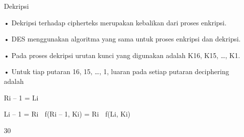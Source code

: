 \documentclass{article}
\begin{document}

Dekripsi

• Dekripsi terhadap cipherteks merupakan kebalikan dari proses enkripsi. 

• DES menggunakan algoritma yang sama untuk proses enkripsi dan dekripsi. 

• Pada proses dekripsi urutan kunci yang digunakan adalah K16, K15, …, K1.

• Untuk tiap putaran 16, 15, …, 1, luaran pada setiap putaran deciphering adalah


Ri – 1 = Li 





             Li – 1 = Ri  f(Ri – 1, Ki) = Ri  f(Li, Ki)

30
\end{document}
